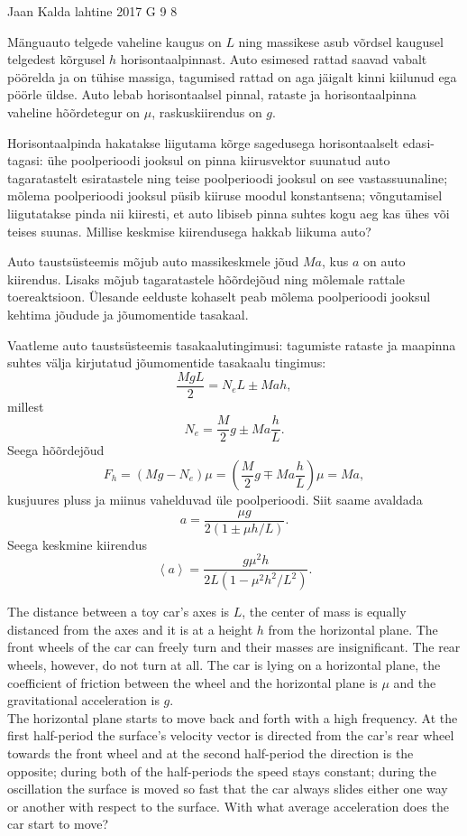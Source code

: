{Jaan Kalda} %
{lahtine} %
{2017} %
{G 9} %
{8} %
{
\ifStatement
Mänguauto telgede vaheline kaugus on $L$ ning massikese asub võrdsel kaugusel telgedest kõrgusel $h$ horisontaalpinnast. Auto esimesed rattad saavad vabalt pöörelda ja on tühise massiga, tagumised rattad on aga jäigalt kinni kiilunud ega pöörle üldse. Auto lebab horisontaalsel pinnal, rataste ja horisontaalpinna vaheline hõõrdetegur on $\mu$, raskuskiirendus on $g$.

Horisontaalpinda hakatakse liigutama kõrge sagedusega horisontaalselt edasi-tagasi: ühe poolperioodi jooksul on pinna kiirusvektor suunatud auto tagaratastelt esiratastele ning teise poolperioodi jooksul on see vastassuunaline; mõlema poolperioodi jooksul püsib kiiruse moodul konstantsena; võngutamisel liigutatakse pinda nii kiiresti, et auto libiseb pinna suhtes kogu aeg kas ühes või teises suunas. Millise keskmise kiirendusega hakkab liikuma auto?
\fi


\ifHint
Auto taustsüsteemis mõjub auto massikeskmele jõud $Ma$, kus $a$ on auto kiirendus. Lisaks mõjub tagaratastele hõõrdejõud ning mõlemale rattale toereaktsioon. Ülesande eelduste kohaselt peab mõlema poolperioodi jooksul kehtima jõudude ja jõumomentide tasakaal.
\fi


\ifSolution
Vaatleme auto taustsüsteemis tasakaalutingimusi: tagumiste rataste ja maapinna suhtes välja kirjutatud jõumomentide tasakaalu tingimus:
\[
\frac {MgL}2=N_eL\pm Mah,
\]
millest
\[
N_e=\frac M2g\pm Ma\frac hL.
\]
Seega hõõrdejõud
\[
F_h=(Mg-N_e)\mu=\left(\frac M2g\mp Ma\frac hL\right)\mu=Ma,
\]
kusjuures pluss ja miinus vahelduvad üle poolperioodi. Siit saame avaldada
\[
a=\frac{\mu g}{2(1\pm \mu h/L)}.
\]
Seega keskmine kiirendus
\[
\left< a\right>=\frac{g\mu^2h}{2L(1-\mu^2h^2/L^2)}.
\]
\fi


\ifEngStatement
The distance between a toy car’s axes is $L$, the center of mass is equally distanced from the axes and it is at a height $h$ from the horizontal plane. The front wheels of the car can freely turn and their masses are insignificant. The rear wheels, however, do not turn at all. The car is lying on a horizontal plane, the coefficient of friction between the wheel and the horizontal plane is $\mu$ and the gravitational acceleration is $g$.\\
The horizontal plane starts to move back and forth with a high frequency. At the first half-period the surface’s velocity vector is directed from the car’s rear wheel towards the front wheel and at the second half-period the direction is the opposite; during both of the half-periods the speed stays constant; during the oscillation the surface is moved so fast that the car always slides either one way or another with respect to the surface. With what average acceleration does the car start to move?
\fi


}
